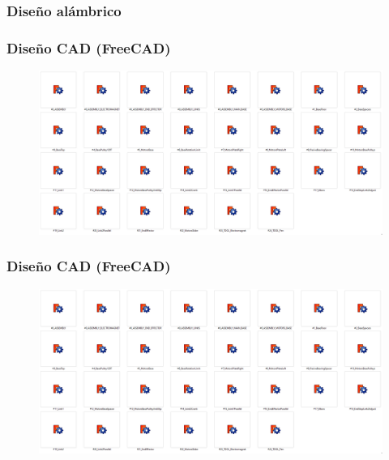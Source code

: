 \documentclass{beamer}
\begin{document}
\begin{frame}
  \frametitle{Diseño alámbrico}

\end{frame}

\begin{frame}
  \frametitle{Diseño CAD (FreeCAD)}
  \begin{figure}[h]
    \centering
    \includegraphics[width=1\textwidth]{figs/freecadFiles.png}
  \end{figure}
\end{frame}

\begin{frame}
  \frametitle{Diseño CAD (FreeCAD)}
  \begin{figure}[h]
    \centering
    \includegraphics[width=1\textwidth]{figs/freecadFiles.png}
  \end{figure}
\end{frame}
\end{document}
